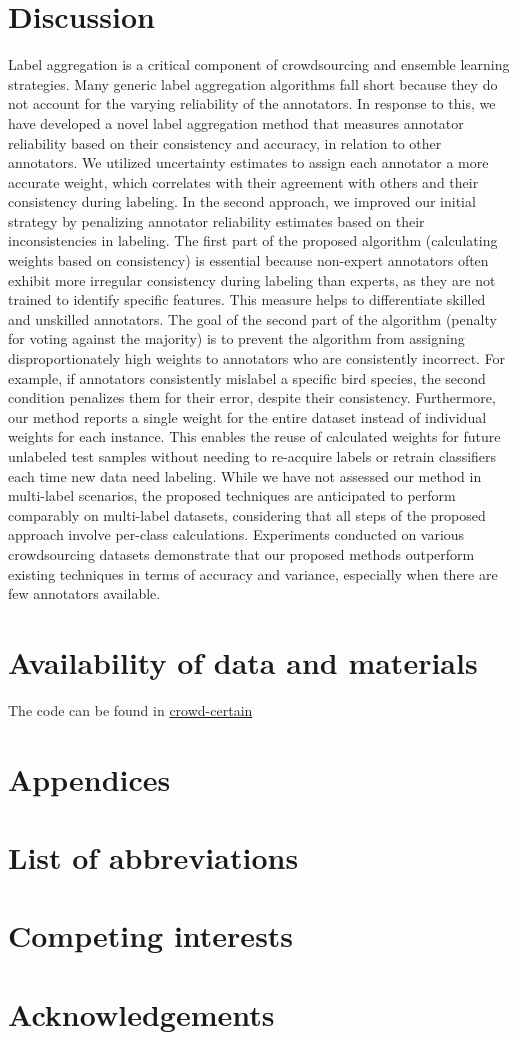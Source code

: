 \section{Discussion}
Label aggregation is a critical component of crowdsourcing and ensemble learning strategies. Many generic label aggregation algorithms fall short because they do not account for the varying reliability of the annotators. In response to this, we have developed a novel label aggregation method that measures annotator reliability based on their consistency and accuracy, in relation to other annotators. We utilized uncertainty estimates to assign each annotator a more accurate weight, which correlates with their agreement with others and their consistency during labeling. In the second approach, we improved our initial strategy by penalizing annotator reliability estimates based on their inconsistencies in labeling.
The first part of the proposed algorithm (calculating weights based on consistency) is essential because non-expert annotators often exhibit more irregular consistency during labeling than experts, as they are not trained to identify specific features. This measure helps to differentiate skilled and unskilled annotators. The goal of the second part of the algorithm (penalty for voting against the majority) is to prevent the algorithm from assigning disproportionately high weights to annotators who are consistently incorrect. For example, if annotators consistently mislabel a specific bird species, the second condition penalizes them for their error, despite their consistency.
Furthermore, our method reports a single weight for the entire dataset instead of individual weights for each instance. This enables the reuse of calculated weights for future unlabeled test samples without needing to re-acquire labels or retrain classifiers each time new data need labeling. While we have not assessed our method in multi-label scenarios, the proposed techniques are anticipated to perform comparably on multi-label datasets, considering that all steps of the proposed approach involve per-class calculations. Experiments conducted on various crowdsourcing datasets demonstrate that our proposed methods outperform existing techniques in terms of accuracy and variance, especially when there are few annotators available.




\section{Availability of data and materials}
The code can be found in \href{http://github.com/artinmajdi/crowdcertain}{crowd-certain}

\section{Appendices}
\section*{List of abbreviations}
\section*{Competing interests}
\section*{Acknowledgements}


